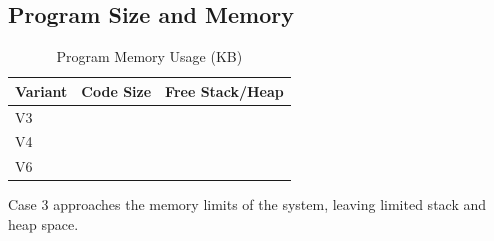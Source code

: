 \subsection{Program Size and Memory}

\begin{table}[H]
\centering
\caption{Program Memory Usage (KB)}
\begin{tabular}{lcc}
\toprule
Variant & Code Size & Free Stack/Heap \\
\midrule
V3 &  &  \\
V4 &  &  \\
V6 &  &  \\
\bottomrule
\end{tabular}
\end{table}

Case 3 approaches the memory limits of the system, leaving limited stack and heap space.
